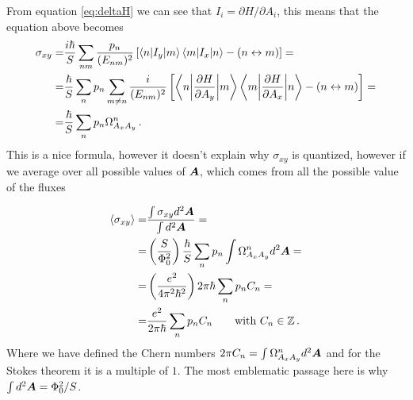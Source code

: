 From equation \ref{eq:deltaH} we can see that $I_i=\partial H/\partial A_i$, this means that the equation above becomes
\begin{equation}
    \begin{split}
        \sigma_{xy}=&
        \frac{i\hbar}S\sum_{nm}\frac{p_n}{(E_{nm})^2}\left[
        \braket{n|I_y}{m}\braket{m|I_x}{n} - (n\leftrightarrow m)
    \right]=\\
    =&\frac \hbar S\sum_{n}p_n\sum_{m\neq n}\frac{i}{(E_{nm})^2}\left[
    \braket{n\bigg|\frac{\partial H}{\partial A_y}}{m}\braket{m\bigg|\frac{\partial H}{\partial A_x}}{n} - (n\leftrightarrow m)
    \right]=\\
    =&\frac \hbar S\sum_{n}p_n\Omega^n_{A_xA_y}\,.
    \end{split}
\end{equation}
This is a nice formula, however it doesn't explain why $\sigma_{xy}$ is quantized, however if we average over all possible values of $\boldsymbol{A}$, which comes from all the possible value of the fluxes

\begin{equation}
    \begin{split}
        \langle\sigma_{xy}\rangle=&
        \frac{\int \sigma_{xy}d^2\boldsymbol{A}}{\int d^2\boldsymbol{A}}=\\
        =&\left(\frac{S}{\Phi_0^2}\right)\frac \hbar S\sum_np_n\int \Omega^n_{A_xA_y}d^2\boldsymbol{A} =\\
        =&\left(\frac{e^2}{4\pi^2\hbar^2}\right)2\pi\hbar\sum_np_nC_n=\\
        =&\frac{e^2}{2\pi\hbar}\sum_np_nC_n\quad \quad \text{with }C_n\in \mathbb Z\,.
    \end{split}
    \label{eq:quantized sigma}
\end{equation}
Where we have defined the Chern numbers $2\pi C_n=\int \Omega^n_{A_xA_y}d^2\boldsymbol{A}$ and for the Stokes theorem it is a multiple of $1$. The most emblematic passage here is why $\int d^2\boldsymbol{A}=\Phi_0^2/S$.\\


